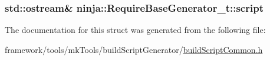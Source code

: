 \subsubsection[{\texorpdfstring{script}{script}}]{\setlength{\rightskip}{0pt plus 5cm}std\+::ostream\& ninja\+::\+Require\+Base\+Generator\+\_\+t\+::script}\hypertarget{structninja_1_1_require_base_generator__t_ad40e8559edc5524f7d764327957f6150}{}\label{structninja_1_1_require_base_generator__t_ad40e8559edc5524f7d764327957f6150}


The documentation for this struct was generated from the following file\+:\begin{DoxyCompactItemize}
\item 
framework/tools/mk\+Tools/build\+Script\+Generator/\hyperlink{build_script_common_8h}{build\+Script\+Common.\+h}\end{DoxyCompactItemize}
